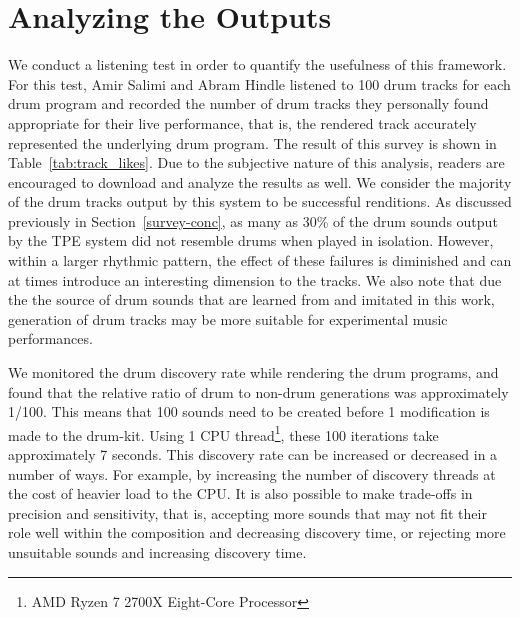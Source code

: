 \documentclass[\main/thesis.tex]{subfiles}
\begin{document}
\section{Analyzing the Outputs}
 We conduct a listening test in order to quantify the usefulness of this framework. For this test, Amir Salimi and Abram Hindle listened to 100 drum tracks for each drum program and recorded the number of drum tracks they personally found appropriate for their live performance, that is, the rendered track accurately represented the underlying drum program. The result of this survey is shown in Table~\ref{tab:track_likes}. Due to the subjective nature of this analysis, readers are encouraged to download and analyze the results as well. We consider the majority of the drum tracks output by this system to be successful renditions. As discussed previously in Section~\ref{survey-conc}, as many as 30\% of the drum sounds output by the TPE system did not resemble drums when played in isolation. However, within a larger rhythmic pattern, the effect of these failures is diminished and can at times introduce an interesting dimension to the tracks. We also note that due the the source of drum sounds that are learned from and imitated in this work, generation of drum tracks may be more suitable for experimental music performances.
 
  We monitored the drum discovery rate while rendering the drum programs, and found that the relative ratio of drum to non-drum generations was approximately 1/100. This means that 100 sounds need to be created before 1 modification is made to the drum-kit. Using 1 CPU thread\footnote{AMD Ryzen 7 2700X Eight-Core Processor}, these 100 iterations take approximately 7 seconds. This discovery rate can be increased or decreased in a number of ways. For example, by increasing the number of discovery threads at the cost of heavier load to the CPU. It is also possible to make trade-offs in precision and sensitivity, that is, accepting more sounds that may not fit their role well within the composition and decreasing discovery time, or rejecting more unsuitable sounds and increasing discovery time. 
\begin{table}[tbp]
\caption{\label{tab:track_likes} Measuring the quality of generated drum tracks by calculating the percentage of liked outputs for each listener.}
\end{table}
\end{document}

